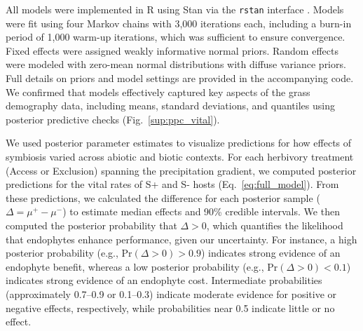 \documentclass[12pt]{article}\usepackage[]{graphicx}\usepackage[dvipsnames]{xcolor}
\newcommand{\tom}[2]{{\color{red}{#1}}\footnote{\textit{\color{red}{#2}}}}
\begin{document}
All models were implemented in R \citep{RCoreTeam} using Stan via the \texttt{rstan} interface \citep{Rstan}. 
Models were fit using four Markov chains with 3,000 iterations each, including a burn-in period of 1,000 warm-up iterations, which was sufficient to ensure convergence.
Fixed effects were assigned weakly informative normal priors. 
Random effects were modeled with zero-mean normal distributions with diffuse variance priors. 
Full details on priors and model settings are provided in the accompanying code.
We confirmed that models effectively captured key aspects of the grass demography data, including means, standard deviations, and quantiles  using posterior predictive checks (Fig.~\ref{sup:ppc_vital}).

We used posterior parameter estimates to visualize predictions for how effects of symbiosis varied across abiotic and biotic contexts. 
For each herbivory treatment (Access or Exclusion) spanning the precipitation gradient, we computed posterior predictions for the vital rates of S+ and S- hosts (Eq.~\ref{eq:full_model}).  
From these predictions, we calculated the difference for each posterior sample ($\Delta = \mu^{+} - \mu^{-}$) to estimate median effects and 90\% credible intervals.  
We then computed the posterior probability that $\Delta > 0$, which quantifies the likelihood that endophytes enhance performance, given our uncertainty. 
For instance, a high posterior probability (e.g., Pr$(\Delta>0) >0.9$) indicates strong evidence of an endophyte benefit, whereas a low posterior probability (e.g., Pr$(\Delta>0) <0.1$) indicates strong evidence of an endophyte cost. 
Intermediate probabilities (approximately 0.7–0.9 or 0.1–0.3) indicate moderate evidence for positive or negative effects, respectively, while probabilities near 0.5 indicate little or no effect.
\end{document}
